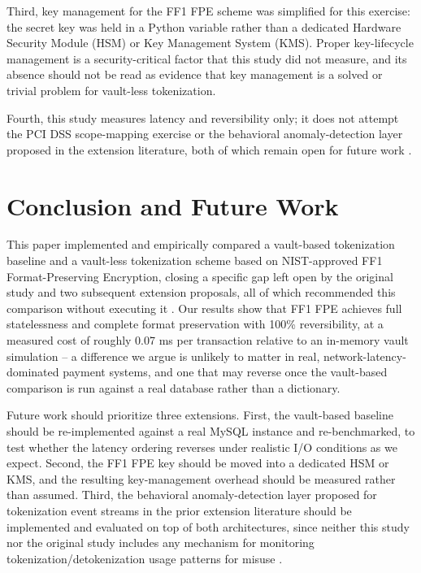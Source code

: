 \documentclass[conference]{IEEEtran}
\begin{document}
Third, key management for the FF1 FPE scheme was simplified for this exercise: the secret key was held in a Python variable rather than a dedicated Hardware Security Module (HSM) or Key Management System (KMS). Proper key-lifecycle management is a security-critical factor that this study did not measure, and its absence should not be read as evidence that key management is a solved or trivial problem for vault-less tokenization.

Fourth, this study measures latency and reversibility only; it does not attempt the PCI DSS scope-mapping exercise or the behavioral anomaly-detection layer proposed in the extension literature, both of which remain open for future work \cite{b2,b3}.

\section{Conclusion and Future Work}
This paper implemented and empirically compared a vault-based tokenization baseline and a vault-less tokenization scheme based on NIST-approved FF1 Format-Preserving Encryption, closing a specific gap left open by the original study and two subsequent extension proposals, all of which recommended this comparison without executing it \cite{b1,b2,b3}. Our results show that FF1 FPE achieves full statelessness and complete format preservation with 100\% reversibility, at a measured cost of roughly 0.07 ms per transaction relative to an in-memory vault simulation -- a difference we argue is unlikely to matter in real, network-latency-dominated payment systems, and one that may reverse once the vault-based comparison is run against a real database rather than a dictionary.

Future work should prioritize three extensions. First, the vault-based baseline should be re-implemented against a real MySQL instance and re-benchmarked, to test whether the latency ordering reverses under realistic I/O conditions as we expect. Second, the FF1 FPE key should be moved into a dedicated HSM or KMS, and the resulting key-management overhead should be measured rather than assumed. Third, the behavioral anomaly-detection layer proposed for tokenization event streams in the prior extension literature should be implemented and evaluated on top of both architectures, since neither this study nor the original study includes any mechanism for monitoring tokenization/detokenization usage patterns for misuse \cite{b2,b3}.
\end{document}

